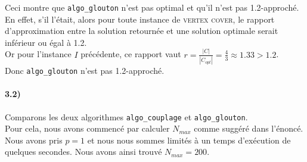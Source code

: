 \documentclass[12pt]{article}
\begin{document}
        Ceci montre que \texttt{algo\_glouton} n'est pas optimal et qu'il n'est pas 1.2-approché. \\
        En effet, s'il l'était, alors pour toute instance de \textsc{vertex cover}, le rapport d'approximation entre la solution retournée et une solution optimale serait inférieur ou égal à 1.2. \\
        Or pour l'instance $I$ précédente, ce rapport vaut $r = \frac{|C|}{|C_{opt}|} = \frac{4}{3} \approx 1.33 > 1.2$. \\
        Donc \texttt{algo\_glouton} n'est pas 1.2-approché.

    \paragraph{3.2)}
        Comparons les deux algorithmes \texttt{algo\_couplage} et \texttt{algo\_glouton}. \\
        Pour cela, nous avons commencé par calculer $N_{max}$ comme suggéré dans l'énoncé. Nous avons pris $p = 1$ et nous nous sommes limités à un temps d'exécution de quelques secondes. Nous avons ainsi trouvé $N_{max} = 200$.
\end{document}
